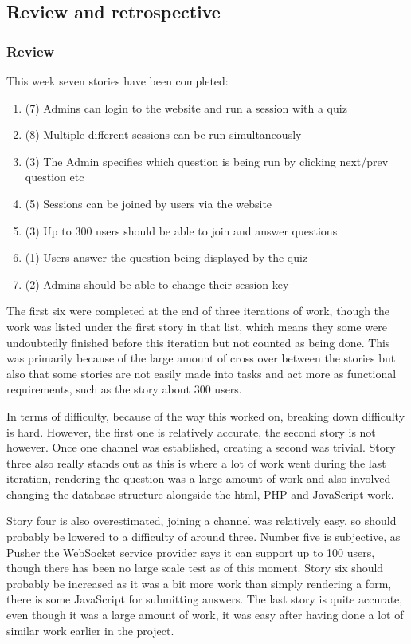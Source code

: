 \subsection{Review and retrospective}
\subsubsection{Review}
This week seven stories have been completed:
\begin{enumerate}
	\item (7) Admins can login to the website and run a session with a quiz
	\item (8) Multiple different sessions can be run simultaneously
	\item (3) The Admin specifies which question is being run by clicking next/prev question etc
	\item (5) Sessions can be joined by users via the website
	\item (3) Up to 300 users should be able to join and answer questions
	\item (1) Users answer the question being displayed by the quiz
	\item (2) Admins should be able to change their session key
\end{enumerate}
The first six were completed at the end of three iterations of work, though the work was listed under the first story in that list, which means they some were undoubtedly finished before this iteration but not counted as being done. This was primarily because of the large amount of cross over between the stories but also that some stories are not easily made into tasks and act more as functional requirements, such as the story about 300 users.

In terms of difficulty, because of the way this worked on, breaking down difficulty is hard. However, the first one is relatively accurate, the second story  is not however. Once one channel was established, creating a second was trivial. Story three also really stands out as this is where a lot of work went during the last iteration, rendering the question was a large amount of work and also involved changing the database structure alongside the html, PHP and JavaScript work. 

Story four is also overestimated, joining a channel was relatively easy, so should probably be lowered to a difficulty of around three. Number five is subjective, as Pusher the WebSocket service provider says it can support up to 100 users, though there has been no large scale test as of this moment. Story six should probably be increased as it was a bit more work than simply rendering a form, there is some JavaScript for submitting answers. The last story is quite accurate, even though it was a large amount of work, it was easy after having done a lot of similar work earlier in the project.

